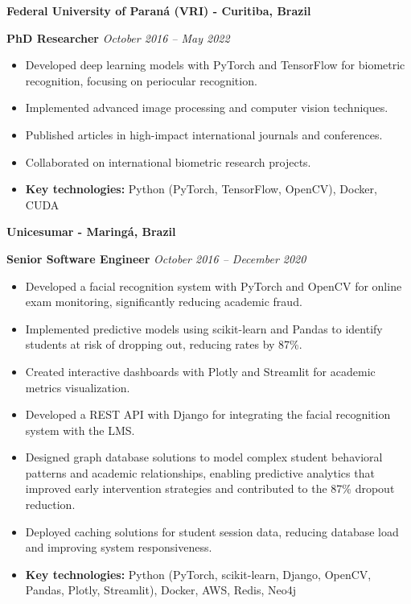 \documentclass[12pt,a4paper,sans]{moderncv}        %
\begin{document}
\vspace{24pt}
\small{\textbf{Federal University of Paraná (VRI) - Curitiba, Brazil}}
\vspace{3pt}

\textbf{PhD Researcher} \hfill \textit{October 2016 -- May 2022}
\begin{itemize}
    \item Developed deep learning models with PyTorch and TensorFlow for biometric recognition, focusing on periocular recognition.
    \item Implemented advanced image processing and computer vision techniques.
    \item Published articles in high-impact international journals and conferences.
    \item Collaborated on international biometric research projects.
    \item \textbf{Key technologies:} Python (PyTorch, TensorFlow, OpenCV), Docker, CUDA
\end{itemize}

\vspace{24pt}
\small{\textbf{Unicesumar - Maringá, Brazil}}
\vspace{3pt}

\textbf{Senior Software Engineer} \hfill \textit{October 2016 -- December 2020}
\begin{itemize}
    \item Developed a facial recognition system with PyTorch and OpenCV for online exam monitoring, significantly reducing academic fraud.
    \item Implemented predictive models using scikit-learn and Pandas to identify students at risk of dropping out, reducing rates by 87\%.
    \item Created interactive dashboards with Plotly and Streamlit for academic metrics visualization.
    \item Developed a REST API with Django for integrating the facial recognition system with the LMS.
    \item Designed graph database solutions to model complex student behavioral patterns and academic relationships, enabling predictive analytics that improved early intervention strategies and contributed to the 87\% dropout reduction.
    \item Deployed caching solutions for student session data, reducing database load and improving system responsiveness.
    \item \textbf{Key technologies:} Python (PyTorch, scikit-learn, Django, OpenCV, Pandas, Plotly, Streamlit), Docker, AWS, Redis, Neo4j
\end{itemize}
\end{document}
